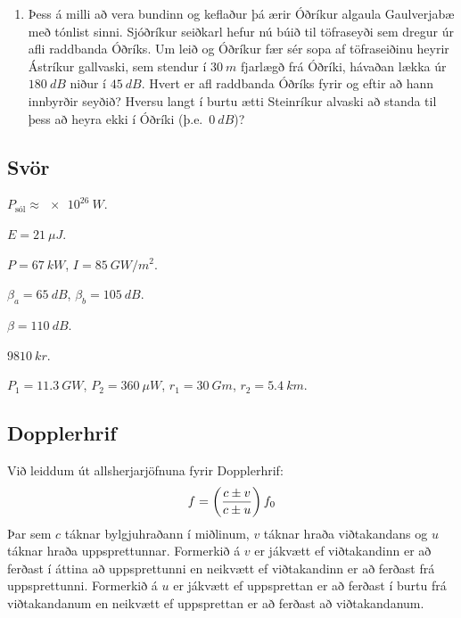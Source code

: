 \begin{enumerate}[label = \textbf{Dæmi \thechapter.\arabic*.}]
\item Þess á milli að vera bundinn og keflaður þá ærir Óðríkur algaula Gaulverjabæ með tónlist sinni. Sjóðríkur seiðkarl hefur nú búið til töfraseyði sem dregur úr afli raddbanda Óðríks. Um leið og Óðríkur fær sér sopa af töfraseiðinu heyrir Ástríkur gallvaski, sem stendur í $\SI{30}{m}$ fjarlægð frá Óðríki, hávaðan lækka úr $\SI{180}{dB}$ niður í $\SI{45}{dB}$. Hvert er afl raddbanda Óðríks fyrir og eftir að hann innbyrðir seyðið? Hversu langt í burtu ætti Steinríkur alvaski að standa til þess að heyra ekki í Óðríki (þ.e.~$\SI{0}{dB}$)?

\end{enumerate}

\subsection*{Svör}

\begin{enumerate*}[label = \vspace{0.15cm} \textbf{(\arabic*)}]
    \setcounter{enumi}{14}
    \item $P_{\text{sól}} \approx \SI{e26}{W}$.
    \item $E = \SI{21}{\mu J}$.
    \item $P = \SI{67}{kW}$, $I = \SI{85}{GW/m^2}$.
    \item $\beta_a = \SI{65}{dB}$, $\beta_b = \SI{105}{dB}$.
    \item $\beta = \SI{110}{dB}$.
    \item $\SI{9810}{kr}$.
    \item $P_1 = \SI{11.3}{GW}$, $P_2 = \SI{360}{\mu W}$, $r_1 = \SI{30}{Gm}$, $r_2  = \SI{5.4}{km}$.
\end{enumerate*}


\subsection*{Dopplerhrif} 

\begin{tcolorbox}
Við leiddum út allsherjarjöfnuna fyrir Dopplerhrif:
\begin{align*} \vspace{-0.2cm}
    f = \left( \frac{c \pm v}{c \pm u} \right)f_0
\end{align*}
Þar sem $c$ táknar bylgjuhraðann í miðlinum, $v$ táknar hraða viðtakandans og $u$ táknar hraða uppsprettunnar. Formerkið á $v$ er jákvætt ef viðtakandinn er að ferðast í áttina að uppsprettunni en neikvætt ef viðtakandinn er að ferðast frá uppsprettunni. Formerkið á $u$ er jákvætt ef uppsprettan er að ferðast í burtu frá viðtakandanum en neikvætt ef uppsprettan er að ferðast að viðtakandanum.
\end{tcolorbox}

